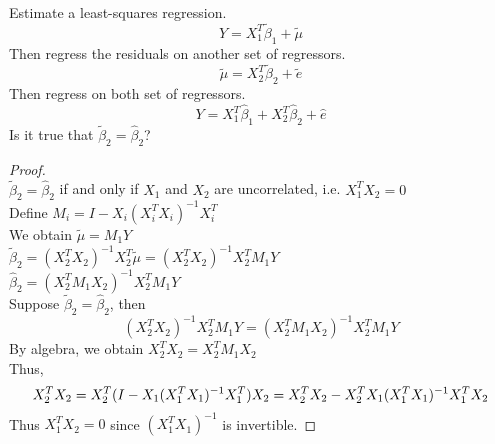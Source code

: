 \documentclass{article}
\begin{document}
	\begin{flushleft}
		Estimate a least-squares regression.
	\[Y=X_{1}^{T}\tilde{\beta}_{1}+\tilde{\mu}\]
	Then regress the residuals on another set of regressors.
	\[\tilde{\mu}=X_{2}^{T}\tilde{\beta}_{2}+\tilde{e}\]
	Then regress on both set of regressors.
	\[Y=X_{1}^{T}\hat{\beta}_{1}+X_{2}^{T}\hat{\beta}_{2}+\hat{e}\]
	Is it true that $\tilde{\beta}_{2}=\hat{\beta}_{2}$?
	\end{flushleft}
	\begin{proof}
		~\\
		\linespread{1.5}
		$\tilde{\beta}_{2}=\hat{\beta}_{2}$ if and only if $X_{1}$ and $X_{2}$ are uncorrelated, i.e. $X_{1}^{T}X_{2}=0$\\
		Define $M_{i}=I-X_{i}(X_{i}^{T}X_{i})^{-1}X_{i}^{T}$\\
		We obtain $\tilde{\mu}=M_{1}Y$\\
		$\tilde{\beta}_{2}=(X_{2}^{T}X_{2})^{-1}X_{2}^{T}\tilde{\mu}=(X_{2}^{T}X_{2})^{-1}X_{2}^{T}M_{1}Y$\\
		$\hat{\beta}_{2}=(X_{2}^{T}M_{1}X_{2})^{-1}X_{2}^{T}M_{1}Y$\\
		Suppose $\tilde{\beta}_{2}=\hat{\beta}_{2}$, then
		\[(X_{2}^{T}X_{2})^{-1}X_{2}^{T}M_{1}Y=(X_{2}^{T}M_{1}X_{2})^{-1}X_{2}^{T}M_{1}Y\]
		By algebra, we obtain $X_{2}^{T}X_{2}=X_{2}^{T}M_{1}X_{2}$\\
		Thus,  \[X_{2}^{T}X_{2}=X_{2}^{T}(I-X_{1}(X_{1}^{T}X_{1})^{-1}X_{1}^{T})X_{2}\\
		=X_{2}^{T}X_{2}-X_{2}^{T}X_{1}(X_{1}^{T}X_{1})^{-1}X_{1}^{T}X_{2}\]
		Thus $X_{1}^{T}X_{2}=0$ since $(X_{1}^{T}X_{1})^{-1}$ is invertible. 
	\end{proof}
\end{document}
